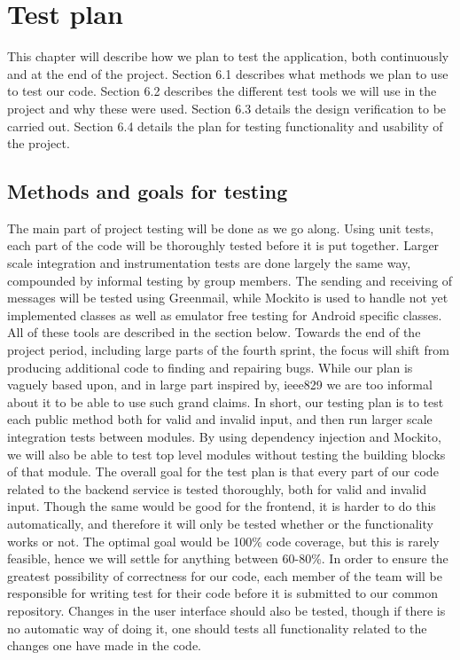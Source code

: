 \chapter{Test plan}\label{chapter_test}

This chapter will describe how we plan to test the application, both continuously and at the end of the project. Section 6.1 describes what methods we plan to use to test our code. Section 6.2 describes the different test tools we will use in the project and why these were used. Section 6.3 details the design verification to be carried out. Section 6.4 details the plan for testing functionality and usability of the project. 

\section{Methods and goals for testing}

The main part of project testing will be done as we go along. Using unit tests, each part of the code will be thoroughly tested before it is put together. Larger scale integration and instrumentation tests are done largely the same way, compounded by informal testing by group members. The sending and receiving of messages will be tested using Greenmail, while Mockito is used to handle not yet implemented classes as well as emulator free testing for Android specific classes. All of these tools are described in the section below. Towards the end of the project period, including large parts of the fourth sprint, the focus will shift from producing additional code to finding and repairing bugs. While our plan is vaguely based upon, and in large part inspired by, \gls{ieee829} \cite{bib:ieee} we are too informal about it to be able to use such grand claims. In short, our testing plan is to test each public method both for valid and invalid input, and then run larger scale integration tests between modules.
By using dependency injection and Mockito, we will also be able to test top level modules without testing the building blocks of that module. 
\newline
\newline
The overall goal for the test plan is that every part of our code related to the backend service is tested thoroughly, both for valid and invalid input. Though the same would be good for the frontend,
it is harder to do this automatically, and therefore it will only be tested whether or the functionality works or not. The optimal goal would be 100\% code coverage, but this is rarely feasible, hence
we will settle for anything between 60-80\%. 
\newline
\newline
In order to ensure the greatest possibility of correctness for our code, each member of the team will be responsible for writing test for their code before it is submitted to our common repository.
Changes in the user interface should also be tested, though if there is no automatic way of doing it, one should tests all functionality related to the changes one have made in the code. 



